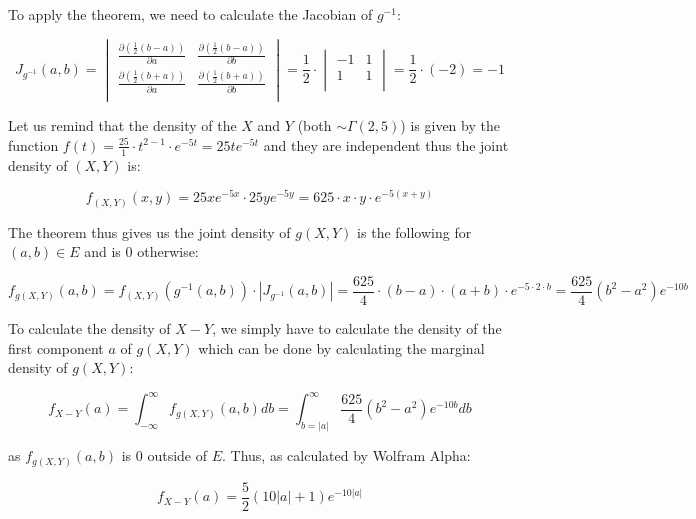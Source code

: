 \documentclass{article}
\begin{document}
To apply the theorem, we need to calculate the Jacobian of $g^{-1}$: 

\renewcommand\arraystretch{2}
$$J_{g^{-1}}(a,b) = \begin{vmatrix}
\frac{\partial(\frac{1}{2}(b-a))}{\partial a}       & \frac{\partial(\frac{1}{2}(b-a))}{\partial b}\\
\frac{\partial(\frac{1}{2}(b+a))}{\partial a}       & \frac{\partial(\frac{1}{2}(b+a))}{\partial b}\\
\end{vmatrix} 
= 
\frac{1}{2}\cdot \begin{vmatrix}
-1       & 1 \\
1       & 1\\
\end{vmatrix} = \frac{1}{2}\cdot(-2) = -1$$

Let us remind that the density of the $X$ and $Y$ (both $\sim \Gamma(2,5)$) is given by the function $f(t) = \frac{25}{1}\cdot t^{2-1}\cdot e^{-5t} = 25te^{-5t}$ and they are independent thus the joint density of $(X,Y)$  is:

$$f_{(X,Y)}(x,y) = 25xe^{-5x} \cdot 25ye^{-5y} = 625\cdot x \cdot y \cdot e^{-5(x+y)}$$

The theorem thus gives us the joint density of $g(X,Y)$ is the following for $(a,b)\in E$ and is $0$ otherwise:

$$f_{g(X,Y)}(a,b) = f_{(X,Y)}(g^{-1}(a,b))\cdot | J_{g^{-1}}(a,b)| = \frac{625}{4}\cdot (b-a) \cdot (a+b) \cdot e^{-5\cdot 2\cdot b} = \frac{625}{4}(b^2-a^2)e^{-10b}$$ 

To calculate the density of $X-Y$, we simply have to calculate the density of the first component $a$ of $g(X,Y)$ which can be done by calculating the marginal density of $g(X,Y)$:

$$f_{X-Y}(a) = \int_{-\infty}^\infty f_{g(X,Y)}(a,b)db = \int_{b=|a|}^\infty \frac{625}{4}(b^2-a^2)e^{-10b} db$$

as $f_{g(X,Y)}(a,b)$ is $0$ outside of $E$. Thus, as calculated by Wolfram Alpha:

$$ f_{X-Y}(a) = \frac{5}{2}(10|a|+1)e^{-10|a|} $$





\end{document}

